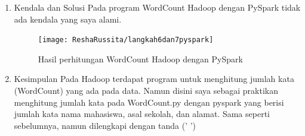 \begin{enumerate}
\item Kendala dan Solusi
\newline Pada program WordCount Hadoop dengan PySpark tidak ada kendala yang saya alami.

\begin{figure}[!ht]
\texttt{[image: ReshaRussita/langkah6dan7pyspark]}
\caption{Hasil perhitungan WordCount Hadoop dengan PySpark}
\label{gam:perkuliahan-22-12}
\end{figure}

\item Kesimpulan
\newline Pada Hadoop terdapat program untuk menghitung jumlah kata (WordCount) yang ada pada data. 
Namun disini saya sebagai praktikan menghitung jumlah kata pada WordCount.py dengan pyspark yang berisi jumlah kata nama mahasiswa, asal sekolah, dan alamat. Sama seperti sebelumnya, namun dilengkapi dengan tanda (' ')

\end{enumerate}

